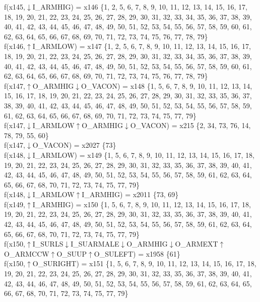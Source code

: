 f(x145,$\downarrow$I\_ARMHIG) = x146 \{1, 2, 5, 6, 7, 8, 9, 10, 11, 12, 13, 14, 15, 16, 17, 18, 19, 20, 21, 22, 23, 24, 25, 26, 27, 28, 29, 30, 31, 32, 33, 34, 35, 36, 37, 38, 39, 40, 41, 42, 43, 44, 45, 46, 47, 48, 49, 50, 51, 52, 53, 54, 55, 56, 57, 58, 59, 60, 61, 62, 63, 64, 65, 66, 67, 68, 69, 70, 71, 72, 73, 74, 75, 76, 77, 78, 79\} \\  
f(x146,$\uparrow$I\_ARMLOW) = x147 \{1, 2, 5, 6, 7, 8, 9, 10, 11, 12, 13, 14, 15, 16, 17, 18, 19, 20, 21, 22, 23, 24, 25, 26, 27, 28, 29, 30, 31, 32, 33, 34, 35, 36, 37, 38, 39, 40, 41, 42, 43, 44, 45, 46, 47, 48, 49, 50, 51, 52, 53, 54, 55, 56, 57, 58, 59, 60, 61, 62, 63, 64, 65, 66, 67, 68, 69, 70, 71, 72, 73, 74, 75, 76, 77, 78, 79\} \\  
f(x147,$\uparrow$O\_ARMHIG$\downarrow$O\_VACON) = x148 \{1, 5, 6, 7, 8, 9, 10, 11, 12, 13, 14, 15, 16, 17, 18, 19, 20, 21, 22, 23, 24, 25, 26, 27, 28, 29, 30, 31, 32, 33, 35, 36, 37, 38, 39, 40, 41, 42, 43, 44, 45, 46, 47, 48, 49, 50, 51, 52, 53, 54, 55, 56, 57, 58, 59, 61, 62, 63, 64, 65, 66, 67, 68, 69, 70, 71, 72, 73, 74, 75, 77, 79\} \\  
f(x147,$\downarrow$I\_ARMLOW$\uparrow$O\_ARMHIG$\downarrow$O\_VACON) = x215 \{2, 34, 73, 76, 14, 78, 79, 55, 60\} \\  
f(x147,$\downarrow$O\_VACON) = x2027 \{73\} \\  
f(x148,$\downarrow$I\_ARMLOW) = x149 \{1, 5, 6, 7, 8, 9, 10, 11, 12, 13, 14, 15, 16, 17, 18, 19, 20, 21, 22, 23, 24, 25, 26, 27, 28, 29, 30, 31, 32, 33, 35, 36, 37, 38, 39, 40, 41, 42, 43, 44, 45, 46, 47, 48, 49, 50, 51, 52, 53, 54, 55, 56, 57, 58, 59, 61, 62, 63, 64, 65, 66, 67, 68, 70, 71, 72, 73, 74, 75, 77, 79\} \\  
f(x148,$\downarrow$I\_ARMLOW$\uparrow$I\_ARMHIG) = x2011 \{73, 69\} \\  
f(x149,$\uparrow$I\_ARMHIG) = x150 \{1, 5, 6, 7, 8, 9, 10, 11, 12, 13, 14, 15, 16, 17, 18, 19, 20, 21, 22, 23, 24, 25, 26, 27, 28, 29, 30, 31, 32, 33, 35, 36, 37, 38, 39, 40, 41, 42, 43, 44, 45, 46, 47, 48, 49, 50, 51, 52, 53, 54, 55, 56, 57, 58, 59, 61, 62, 63, 64, 65, 66, 67, 68, 70, 71, 72, 73, 74, 75, 77, 79\} \\  
f(x150,$\uparrow$I\_SURLS$\downarrow$I\_SUARMALE$\downarrow$O\_ARMHIG$\downarrow$O\_ARMEXT$\uparrow$O\_ARMCCW$\uparrow$O\_SUUP$\uparrow$O\_SULEFT) = x1958 \{61\} \\  
f(x150,$\uparrow$O\_SURIGHT) = x151 \{1, 5, 6, 7, 8, 9, 10, 11, 12, 13, 14, 15, 16, 17, 18, 19, 20, 21, 22, 23, 24, 25, 26, 27, 28, 29, 30, 31, 32, 33, 35, 36, 37, 38, 39, 40, 41, 42, 43, 44, 46, 47, 48, 49, 50, 51, 52, 53, 54, 55, 56, 57, 58, 59, 61, 62, 63, 64, 65, 66, 67, 68, 70, 71, 72, 73, 74, 75, 77, 79\} \\  
